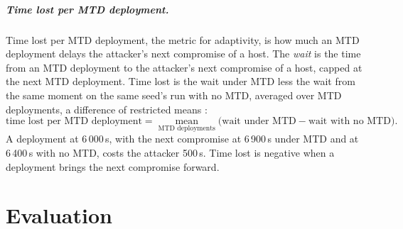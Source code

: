 \documentclass{cshonours}
\begin{document}
\paragraph{Time lost per MTD deployment.}
Time lost per MTD deployment, the metric for adaptivity, is how much an MTD
deployment delays the attacker's next compromise of a host. The \emph{wait} is
the time from an MTD deployment to the attacker's next compromise of a host,
capped at the next MTD deployment. Time lost is the wait under MTD less the
wait from the same moment on the same seed's run with no MTD, averaged over
MTD deployments, a difference of restricted means \citep[eq.~(1)]{royston2013}:
\begin{equation}
  \text{time lost per MTD deployment} = \operatorname*{mean}_{\text{MTD deployments}}
  \bigl( \text{wait under MTD} - \text{wait with no MTD} \bigr).
  \label{eq:time-lost}
\end{equation}
A deployment at 6\,000\,s, with the next compromise at 6\,900\,s under MTD and at
6\,400\,s with no MTD, costs the attacker 500\,s. Time lost is negative when a
deployment brings the next compromise forward.


\chapter{Evaluation}
\label{ch:experiments}

\end{document}
